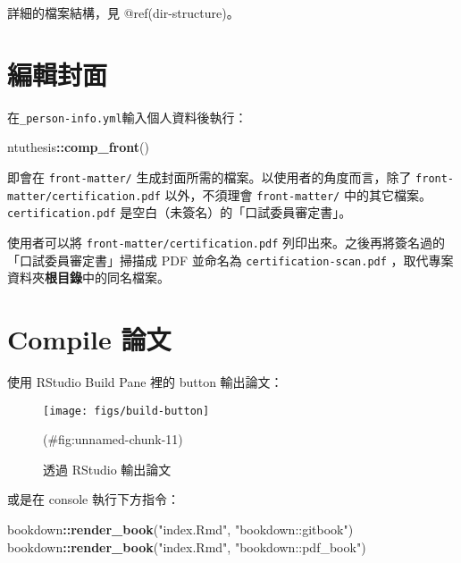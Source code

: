 \documentclass[oneside]{book}
\newenvironment{Shaded}{\begin{snugshade}}{\end{snugshade}}
\newcommand{\KeywordTok}[1]{\textcolor[rgb]{0.13,0.29,0.53}{\textbf{#1}}}
\newcommand{\NormalTok}[1]{#1}
\newcommand{\OperatorTok}[1]{\textcolor[rgb]{0.81,0.36,0.00}{\textbf{#1}}}
\newcommand{\StringTok}[1]{\textcolor[rgb]{0.31,0.60,0.02}{#1}}
\begin{document}
詳細的檔案結構，見 @ref(dir-structure)。

\hypertarget{edit-front-matter}{%
\section{編輯封面}\label{edit-front-matter}}

在\texttt{\_person-info.yml}輸入個人資料後執行：

\begin{Shaded}
\begin{Highlighting}[]
\NormalTok{ntuthesis}\OperatorTok{::}\KeywordTok{comp_front}\NormalTok{()}
\end{Highlighting}
\end{Shaded}

即會在 \texttt{front-matter/} 生成封面所需的檔案。以使用者的角度而言，除了 \texttt{front-matter/certification.pdf} 以外，不須理會 \texttt{front-matter/} 中的其它檔案。\texttt{certification.pdf} 是空白（未簽名）的「口試委員審定書」。

使用者可以將 \texttt{front-matter/certification.pdf} 列印出來。之後再將簽名過的「口試委員審定書」掃描成 PDF 並命名為 \texttt{certification-scan.pdf} ，取代專案資料夾\textbf{根目錄}中的同名檔案。

\hypertarget{compile-thesis}{%
\section{Compile 論文}\label{compile-thesis}}

使用 RStudio Build Pane 裡的 button 輸出論文：

\begin{figure}

{\centering \texttt{[image: figs/build-button]} 

}

\caption{透過 RStudio 輸出論文}(\#fig:unnamed-chunk-11)
\end{figure}

或是在 console 執行下方指令：

\begin{Shaded}
\begin{Highlighting}[]
\NormalTok{bookdown}\OperatorTok{::}\KeywordTok{render_book}\NormalTok{(}\StringTok{"index.Rmd"}\NormalTok{, }\StringTok{"bookdown::gitbook"}\NormalTok{)}
\NormalTok{bookdown}\OperatorTok{::}\KeywordTok{render_book}\NormalTok{(}\StringTok{"index.Rmd"}\NormalTok{, }\StringTok{"bookdown::pdf_book"}\NormalTok{)}
\end{Highlighting}
\end{Shaded}
\end{document}
